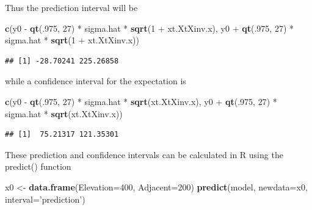 \documentclass[]{book}
\newenvironment{Shaded}{\begin{snugshade}}{\end{snugshade}}
\newcommand{\KeywordTok}[1]{\textcolor[rgb]{0.13,0.29,0.53}{\textbf{{#1}}}}
\newcommand{\DataTypeTok}[1]{\textcolor[rgb]{0.13,0.29,0.53}{{#1}}}
\newcommand{\DecValTok}[1]{\textcolor[rgb]{0.00,0.00,0.81}{{#1}}}
\newcommand{\StringTok}[1]{\textcolor[rgb]{0.31,0.60,0.02}{{#1}}}
\newcommand{\NormalTok}[1]{{#1}}
\theoremstyle{definition}
\theoremstyle{definition}
\theoremstyle{remark}
\begin{document}
Thus the prediction interval will be

\begin{Shaded}
\begin{Highlighting}[]
\KeywordTok{c}\NormalTok{(y0 -}\StringTok{ }\KeywordTok{qt}\NormalTok{(.}\DecValTok{975}\NormalTok{, }\DecValTok{27}\NormalTok{) *}\StringTok{ }\NormalTok{sigma.hat *}\StringTok{ }\KeywordTok{sqrt}\NormalTok{(}\DecValTok{1} \NormalTok{+}\StringTok{ }\NormalTok{xt.XtXinv.x),}
  \NormalTok{y0 +}\StringTok{ }\KeywordTok{qt}\NormalTok{(.}\DecValTok{975}\NormalTok{, }\DecValTok{27}\NormalTok{) *}\StringTok{ }\NormalTok{sigma.hat *}\StringTok{ }\KeywordTok{sqrt}\NormalTok{(}\DecValTok{1} \NormalTok{+}\StringTok{ }\NormalTok{xt.XtXinv.x))}
\end{Highlighting}
\end{Shaded}

\begin{verbatim}
## [1] -28.70241 225.26858
\end{verbatim}

while a confidence interval for the expectation is

\begin{Shaded}
\begin{Highlighting}[]
\KeywordTok{c}\NormalTok{(y0 -}\StringTok{ }\KeywordTok{qt}\NormalTok{(.}\DecValTok{975}\NormalTok{, }\DecValTok{27}\NormalTok{) *}\StringTok{ }\NormalTok{sigma.hat *}\StringTok{ }\KeywordTok{sqrt}\NormalTok{(xt.XtXinv.x),}
  \NormalTok{y0 +}\StringTok{ }\KeywordTok{qt}\NormalTok{(.}\DecValTok{975}\NormalTok{, }\DecValTok{27}\NormalTok{) *}\StringTok{ }\NormalTok{sigma.hat *}\StringTok{ }\KeywordTok{sqrt}\NormalTok{(xt.XtXinv.x))}
\end{Highlighting}
\end{Shaded}

\begin{verbatim}
## [1]  75.21317 121.35301
\end{verbatim}

These prediction and confidence intervals can be calculated in R using
the predict() function

\begin{Shaded}
\begin{Highlighting}[]
\NormalTok{x0 <-}\StringTok{ }\KeywordTok{data.frame}\NormalTok{(}\DataTypeTok{Elevation=}\DecValTok{400}\NormalTok{, }\DataTypeTok{Adjacent=}\DecValTok{200}\NormalTok{)}
\KeywordTok{predict}\NormalTok{(model, }\DataTypeTok{newdata=}\NormalTok{x0, }\DataTypeTok{interval=}\StringTok{'prediction'}\NormalTok{)}
\end{Highlighting}
\end{Shaded}
\end{document}
